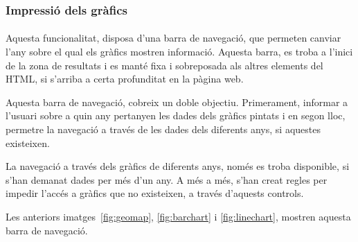 \subsubsection{Impressió dels gràfics}

\paragraph{}
Aquesta funcionalitat, disposa d’una barra de navegació, que permeten canviar l’any sobre el qual els gràfics mostren informació. Aquesta barra, es troba a l’inici de la zona de resultats i es manté fixa i sobreposada als altres elements del HTML, si s’arriba a certa profunditat en la pàgina web.

Aquesta barra de navegació, cobreix un doble objectiu. Primerament, informar a l'usuari sobre a quin any pertanyen les dades dels gràfics pintats i en segon lloc, permetre la navegació a través de les dades dels diferents anys, si aquestes existeixen.

La navegació a través dels gràfics de diferents anys, només es troba disponible, si s'han demanat dades per més d'un any. A més a més, s’han creat regles per impedir l'accés a gràfics que no existeixen, a través d’aquests controls.

Les anteriors imatges~\ref{fig:geomap}, \ref{fig:barchart} i \ref{fig:linechart}, mostren aquesta barra de navegació.
